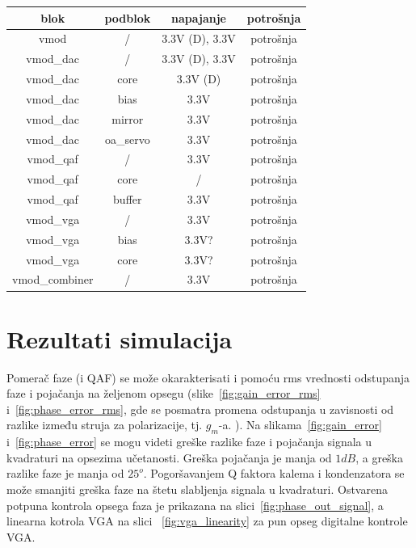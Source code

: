 \documentclass[journal,twocolumn,letterpaper]{IEEEJERM}
\begin{document}
\begin{center}
  \begin{tabular}{| c | c | c | c |}
    \hline
    blok & podblok & napajanje & potrošnja \\
    \hline
    \hline
    vmod & / & 3.3V (D), 3.3V & potrošnja \\
    \hline
    vmod\_dac & / & 3.3V (D), 3.3V & potrošnja \\
    \hline
    vmod\_dac & core & 3.3V (D) & potrošnja \\ 
    \hline
    vmod\_dac & bias & 3.3V & potrošnja \\
    \hline
    vmod\_dac  & mirror & 3.3V & potrošnja \\
    \hline
    vmod\_dac & oa\_servo & 3.3V & potrošnja\\
    \hline
    vmod\_qaf & / & 3.3V & potrošnja\\
    \hline
    vmod\_qaf & core &  / & potrošnja\\
    \hline
    vmod\_qaf & buffer & 3.3V & potrošnja\\
    \hline
    vmod\_vga &  / & 3.3V & potrošnja\\
    \hline
    vmod\_vga & bias & 3.3V? & potrošnja \\
    \hline
    vmod\_vga & core & 3.3V? & potrošnja \\
    \hline
    vmod\_combiner & / & 3.3V & potrošnja \\
    \hline
  \end{tabular}
\end{center}


\section{Rezultati simulacija}

Pomerač faze (i QAF) se može okarakterisati i pomoću rms vrednosti odstupanja faze i pojačanja na željenom opsegu (slike~\ref{fig:gain_error_rms} i~\ref{fig:phase_error_rms}, gde se posmatra promena odstupanja u zavisnosti od razlike između struja za polarizacije, tj. $g_m$-a. ).
Na slikama~\ref{fig:gain_error} i~\ref{fig:phase_error} se mogu videti greške razlike faze i pojačanja signala u kvadraturi na opsezima učetanosti. Greška pojačanja je manja od $1 dB$, a greška razlike faze je manja od $25^o$. Pogoršavanjem Q faktora kalema i kondenzatora se može smanjiti greška faze na štetu slabljenja signala u kvadraturi.  
Ostvarena potpuna kontrola opsega faza je prikazana na slici~\ref{fig:phase_out_signal}, a linearna kotrola VGA na slici ~\ref{fig:vga_linearity} za pun opseg digitalne kontrole VGA. \\
\end{document}
